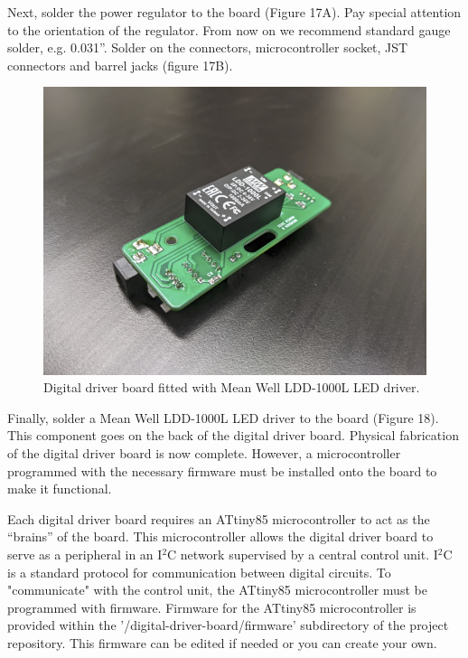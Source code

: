 \documentclass[11pt]{article}
\begin{document}
Next, solder the power regulator to the board (Figure 17A).
Pay special attention to the orientation of the regulator.
From now on we recommend standard gauge solder, e.g. 0.031''.
Solder on the connectors, microcontroller socket, JST connectors and barrel jacks (figure 17B).

\begin{figure}[H]
	\centering
	\includegraphics[width=\textwidth/2]{"./fig18.png"}
	\caption{Digital driver board fitted with Mean Well LDD-1000L LED driver.}
\end{figure}

Finally, solder a Mean Well LDD-1000L LED driver to the board (Figure 18).
This component goes on the back of the digital driver board.
Physical fabrication of the digital driver board is now complete.
However, a microcontroller programmed with the necessary firmware must be installed onto the board to make it functional.

Each digital driver board requires an ATtiny85 microcontroller to act as the ``brains'' of the board.
This microcontroller allows the digital driver board to serve as a peripheral in an I$^2$C network supervised by a central control unit.
I$^2$C is a standard protocol for communication between digital circuits.
To "communicate" with the control unit, the ATtiny85 microcontroller must be programmed with firmware.
Firmware for the ATtiny85 microcontroller is provided within the '/digital-driver-board/firmware' subdirectory of the project repository.
This firmware can be edited if needed or you can create your own. 
\end{document}
